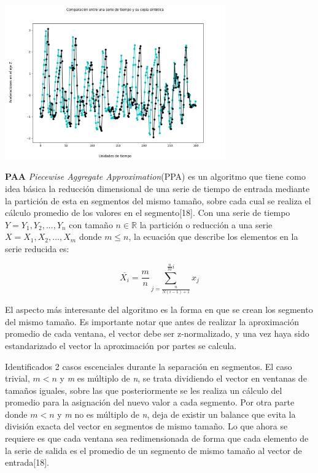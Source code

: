 	\begin{minipage}{\linewidth}
		\centering
		\includegraphics[width=9.5cm]{Imagenes/DTW_sinteticos_2.png}
	\end{minipage}
\hfill\break
\justifying
\textbf{PAA}
	\hfill\break
	\justifying
	\textit{Piecewise Aggregate Approximation}(PPA) es un algoritmo que tiene como idea básica la reducción dimensional de una serie de tiempo de entrada mediante la partición de esta en segmentos del mismo tamaño, sobre cada cual se realiza el cálculo promedio de los valores en el segmento[18]. Con una serie de tiempo $Y = Y_1,Y_2,...,Y_n$ con tamaño $n \in \mathbb{R}$ la partición o reducción a una serie $X = X_1,X_2,...,X_m$ donde $m\leq n$, la ecuación que describe los elementos en la serie reducida es:
	
	\begin{equation*}
		\overline{X_i} = \frac{m}{n} \sum_{j=\frac{n}{N(i-1)+1}}^{\frac{n}{M}i}x_j
	\end{equation*}
	
	\hfill\break
	\justifying
	El aspecto más interesante del algoritmo es la forma en que se crean los segmento del mismo tamaño. Es importante notar que antes de realizar la aproximación promedio de cada ventana, el vector debe ser z-normalizado, y una vez haya sido estandarizado el vector la aproximación por partes se calcula.
	
	\hfill\break
	\justifying
	Identificados 2 casos escenciales durante la separación en segmentos. El caso trivial, $m<n$ y \textit{m} es múltiplo de \textit{n}, se trata dividiendo el vector en ventanas de tamaños iguales, sobre las que posteriormente se les realiza un cálculo del promedio para la asignación del nuevo valor a cada segmento. Por otra parte donde $m<n$ y \textit{m} no es múltiplo de \textit{n}, deja de existir un balance que evita la división exacta del vector en segmentos de mismo tamaño. Lo que ahora se requiere es que cada ventana sea redimensionada de forma que cada elemento de la serie de salida es el promedio de un segmento de mismo tamaño al vector de entrada[18].
	
